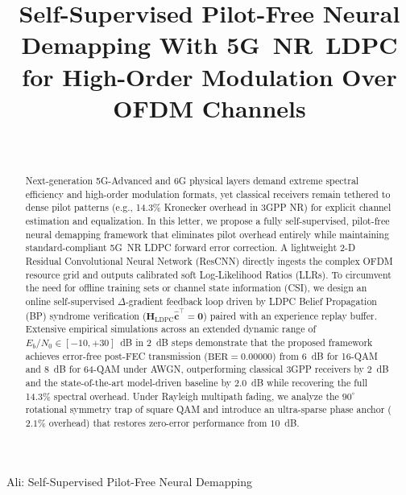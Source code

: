 ﻿\documentclass[journal,twoside]{IEEEtran}
\begin{document}
\title{Self-Supervised Pilot-Free Neural Demapping With 5G~NR~LDPC\\
for High-Order Modulation Over OFDM Channels}

\author{%
  \\
}

%
{Ali: Self-Supervised Pilot-Free Neural Demapping}

\maketitle

\begin{abstract}
Next-generation 5G-Advanced and 6G physical layers demand extreme spectral
efficiency and high-order modulation formats, yet classical receivers remain
tethered to dense pilot patterns (e.g., 14.3\% Kronecker overhead in 3GPP NR)
for explicit channel estimation and equalization.
In this letter, we propose a fully self-supervised, pilot-free neural demapping
framework that eliminates pilot overhead entirely while maintaining standard-compliant
5G~NR LDPC forward error correction.
A lightweight 2-D Residual Convolutional Neural Network (ResCNN) directly ingests
the complex OFDM resource grid and outputs calibrated soft Log-Likelihood
Ratios (LLRs). 
To circumvent the need for offline training sets or channel state information (CSI),
we design an online self-supervised $\Delta$-gradient feedback loop driven by
LDPC Belief Propagation (BP) syndrome verification ($\mathbf{H}_{\mathrm{LDPC}}\hat{\mathbf{c}}^\top = \mathbf{0}$)
paired with an experience replay buffer.
Extensive empirical simulations across an extended dynamic range of
$E_b/N_0 \in [-10, +30]$~dB in 2~dB steps demonstrate that the proposed framework
achieves error-free post-FEC transmission ($\text{BER} = 0.00000$) from $6$~dB
for 16-QAM and $8$~dB for 64-QAM under AWGN, outperforming classical 3GPP receivers
by $2$~dB and the state-of-the-art model-driven baseline by $2.0$~dB while recovering
the full 14.3\% spectral overhead.
Under Rayleigh multipath fading, we analyze the $90^\circ$ rotational symmetry
trap of square QAM and introduce an ultra-sparse phase anchor ($2.1\%$ overhead)
that restores zero-error performance from $10$~dB.
\end{abstract}
\end{document}
